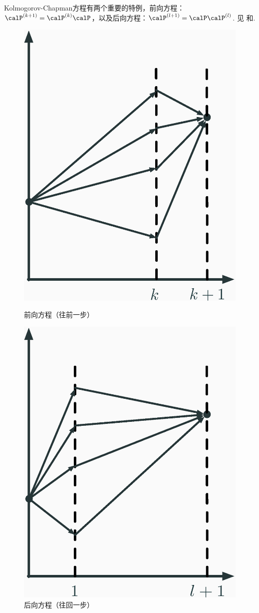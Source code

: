 Kolmogorov-Chapman方程有两个重要的特例，前向方程：$\calP^{(k+1)}=\calP^{(k)}\calP$，以及后向方程：$\calP^{(l+1)}=\calP\calP^{(l)}$. 见 和.
\begin{figure}[ht]
    \begin{minipage}[t]{0.45\linewidth}
        \centering
        \includegraphics[width=0.7\linewidth]{Figures/Markov-chain/forward-equation.eps}
        \caption{前向方程（往前一步）}
        \label{fig:forward-equation}
    \end{minipage}
    \hfill
    \begin{minipage}[t]{0.45\linewidth}
        \centering
        \includegraphics[width=0.7\linewidth]{Figures/Markov-chain/backward-equation.eps}
        \caption{后向方程（往回一步）}
        \label{fig:backward-equation}
    \end{minipage}
\end{figure}

